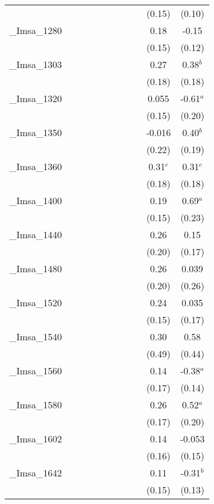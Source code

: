 \documentclass[]{article}
\begin{document}
\begin{tabular}{lcccccccccc}
 &  &  &  &  &  &  &  &  & (0.15) & (0.10) \\
\_Imsa\_1280 &  &  &  &  &  &  &  &  & 0.18 & -0.15 \\
 &  &  &  &  &  &  &  &  & (0.15) & (0.12) \\
\_Imsa\_1303 &  &  &  &  &  &  &  &  & 0.27 & 0.38$^b$ \\
 &  &  &  &  &  &  &  &  & (0.18) & (0.18) \\
\_Imsa\_1320 &  &  &  &  &  &  &  &  & 0.055 & -0.61$^a$ \\
 &  &  &  &  &  &  &  &  & (0.15) & (0.20) \\
\_Imsa\_1350 &  &  &  &  &  &  &  &  & -0.016 & 0.40$^b$ \\
 &  &  &  &  &  &  &  &  & (0.22) & (0.19) \\
\_Imsa\_1360 &  &  &  &  &  &  &  &  & 0.31$^c$ & 0.31$^c$ \\
 &  &  &  &  &  &  &  &  & (0.18) & (0.18) \\
\_Imsa\_1400 &  &  &  &  &  &  &  &  & 0.19 & 0.69$^a$ \\
 &  &  &  &  &  &  &  &  & (0.15) & (0.23) \\
\_Imsa\_1440 &  &  &  &  &  &  &  &  & 0.26 & 0.15 \\
 &  &  &  &  &  &  &  &  & (0.20) & (0.17) \\
\_Imsa\_1480 &  &  &  &  &  &  &  &  & 0.26 & 0.039 \\
 &  &  &  &  &  &  &  &  & (0.20) & (0.26) \\
\_Imsa\_1520 &  &  &  &  &  &  &  &  & 0.24 & 0.035 \\
 &  &  &  &  &  &  &  &  & (0.15) & (0.17) \\
\_Imsa\_1540 &  &  &  &  &  &  &  &  & 0.30 & 0.58 \\
 &  &  &  &  &  &  &  &  & (0.49) & (0.44) \\
\_Imsa\_1560 &  &  &  &  &  &  &  &  & 0.14 & -0.38$^a$ \\
 &  &  &  &  &  &  &  &  & (0.17) & (0.14) \\
\_Imsa\_1580 &  &  &  &  &  &  &  &  & 0.26 & 0.52$^a$ \\
 &  &  &  &  &  &  &  &  & (0.17) & (0.20) \\
\_Imsa\_1602 &  &  &  &  &  &  &  &  & 0.14 & -0.053 \\
 &  &  &  &  &  &  &  &  & (0.16) & (0.15) \\
\_Imsa\_1642 &  &  &  &  &  &  &  &  & 0.11 & -0.31$^b$ \\
 &  &  &  &  &  &  &  &  & (0.15) & (0.13) \\

\end{tabular}
\end{document}
